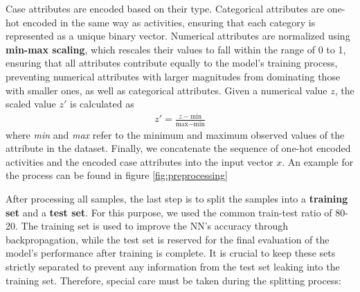 Case attributes are encoded based on their type.
Categorical attributes are one-hot encoded in the same way as activities,
ensuring that each category is represented as a unique binary vector.
Numerical attributes are normalized using \textbf{min-max scaling},
which rescales their values to fall within the range of 0 to 1,
ensuring that all attributes contribute equally to the model's training process,
preventing numerical attributes with larger magnitudes from dominating those with smaller ones,
as well as categorical attributes.
Given a numerical value $z$, the scaled value $z'$ is calculated as 
\begin{align}
    z' = \frac{z - \text{min}}{\text{max} - \text{min}}
\end{align}
where \textit{min} and \textit{max} refer to the minimum and maximum observed values of the attribute in the dataset.
Finally, we concatenate the sequence of one-hot encoded activities
and the encoded case attributes into the input vector $x$.
An example for the process can be found in figure \ref{fig:preprocessing}

After processing all samples, the last step is to split the samples into a \textbf{training set} and a \textbf{test set}.
For this purpose, we used the common train-test ratio of 80-20.
The training set is used to improve the NN's accuracy through backpropagation,
while the test set is reserved for the final evaluation of the model's performance after training is complete.
It is crucial to keep these sets strictly separated to prevent any information
from the test set leaking into the training set.
Therefore, special care must be taken during the splitting process: \cite{data_split}

